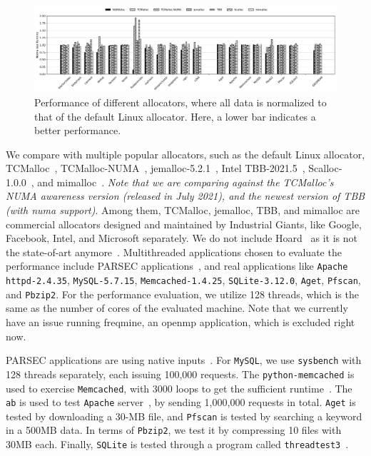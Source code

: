 \label{sec:performance}
\begin{figure}[!ht]
    \centering
    \includegraphics[width=7in]{EuroSys2022/figure/8-node-parsec-perf2.jpg}
    \caption{Performance of different allocators, where all data is normalized to \\ that of the default Linux allocator. Here, a lower bar indicates a better performance.
    \label{fig:perf}}
 \end{figure}
 
 
 
 We compare \NM{} with multiple popular allocators, such as the default Linux allocator, TCMalloc~\cite{tcmalloc2},  TCMalloc-NUMA~\cite{tcmallocnew}, jemalloc-5.2.1~\cite{jemalloc}, Intel TBB-2021.5~\cite{tbb2}, Scalloc-1.0.0~\cite{Scalloc}, and mimalloc~\cite{mimalloc}. \textit{Note that we are comparing against the TCMalloc's NUMA awareness version (released in July 2021), and the newest version of TBB (with numa support)}. Among them, TCMalloc, jemalloc, TBB, and mimalloc are commercial allocators designed and maintained by Industrial Giants, like Google, Facebook, Intel, and Microsoft separately. We do not include Hoard~\cite{Hoard} as it is not the state-of-art anymore~\cite{Scalloc, mimalloc}. Multithreaded applications chosen to evaluate the performance include PARSEC applications~\cite{parsec}, and real applications like \texttt{Apache httpd-2.4.35}, \texttt{MySQL-5.7.15}, \texttt{Memcached-1.4.25}, \texttt{SQLite-3.12.0}, \texttt{Aget}, \texttt{Pfscan}, and \texttt{Pbzip2}. For the performance evaluation, we utilize 128 threads, which is the same as the number of cores of the evaluated machine. Note that we currently have an issue running freqmine, an openmp application, which is excluded right now. 
 
PARSEC applications are using native inputs~\cite{parsec}. For \texttt{MySQL}, we use \texttt{sysbench} with 128 threads separately, each issuing 100,000 requests. The \texttt{python-memcached}  is used to exercise \texttt{Memcached}, with 3000 loops to get the sufficient runtime~\cite{memcached}. The \texttt{ab} is used to test \texttt{Apache} server~\cite{apachetest}, by sending 1,000,000 requests in total. \texttt{Aget} is tested by downloading a 30-MB file, and \texttt{Pfscan} is tested by searching  a keyword in a 500MB data. In terms of \texttt{Pbzip2}, we test it by compressing 10 files with 30MB each. Finally, \texttt{SQLite} is tested through a program called \texttt{threadtest3}~\cite{sqlitetest}. 

